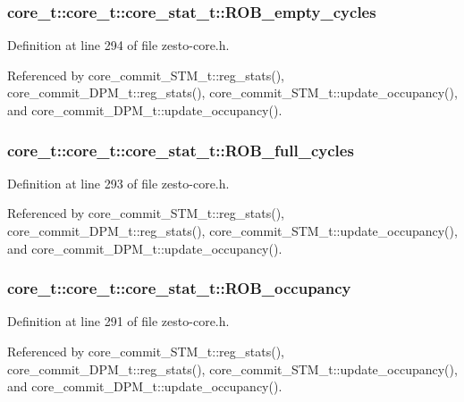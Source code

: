 \subsubsection[{ROB\_\-empty\_\-cycles}]{ core\_\-t::core\_\-t::core\_\-stat\_\-t::ROB\_\-empty\_\-cycles}\label{structcore__t_1_1core__stat__t_2eda3dc8169484641c1b9fd2e511e85c}




Definition at line 294 of file zesto-core.h.

Referenced by core\_\-commit\_\-STM\_\-t::reg\_\-stats(), core\_\-commit\_\-DPM\_\-t::reg\_\-stats(), core\_\-commit\_\-STM\_\-t::update\_\-occupancy(), and core\_\-commit\_\-DPM\_\-t::update\_\-occupancy().
\subsubsection[{ROB\_\-full\_\-cycles}]{ core\_\-t::core\_\-t::core\_\-stat\_\-t::ROB\_\-full\_\-cycles}\label{structcore__t_1_1core__stat__t_beff139f1bd9e6510270680bcb52d775}




Definition at line 293 of file zesto-core.h.

Referenced by core\_\-commit\_\-STM\_\-t::reg\_\-stats(), core\_\-commit\_\-DPM\_\-t::reg\_\-stats(), core\_\-commit\_\-STM\_\-t::update\_\-occupancy(), and core\_\-commit\_\-DPM\_\-t::update\_\-occupancy().
\subsubsection[{ROB\_\-occupancy}]{ core\_\-t::core\_\-t::core\_\-stat\_\-t::ROB\_\-occupancy}\label{structcore__t_1_1core__stat__t_899085658ec2043bdc858c5d80c77042}




Definition at line 291 of file zesto-core.h.

Referenced by core\_\-commit\_\-STM\_\-t::reg\_\-stats(), core\_\-commit\_\-DPM\_\-t::reg\_\-stats(), core\_\-commit\_\-STM\_\-t::update\_\-occupancy(), and core\_\-commit\_\-DPM\_\-t::update\_\-occupancy().
